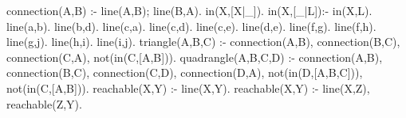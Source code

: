 connection(A,B) :- line(A,B); line(B,A).
in(X,[X|_]).
in(X,[_|L]):- in(X,L).
line(a,b).
line(b,d).
line(c,a).
line(c,d).
line(c,e).
line(d,e).
line(f,g).
line(f,h).
line(g,j).
line(h,i).
line(i,j).
triangle(A,B,C) :- connection(A,B), connection(B,C), connection(C,A), not(in(C,[A,B])).
quadrangle(A,B,C,D) :- connection(A,B), connection(B,C), connection(C,D), connection(D,A), 
                       not(in(D,[A,B,C])), not(in(C,[A,B])).
reachable(X,Y) :- line(X,Y).
reachable(X,Y) :- line(X,Z), reachable(Z,Y).